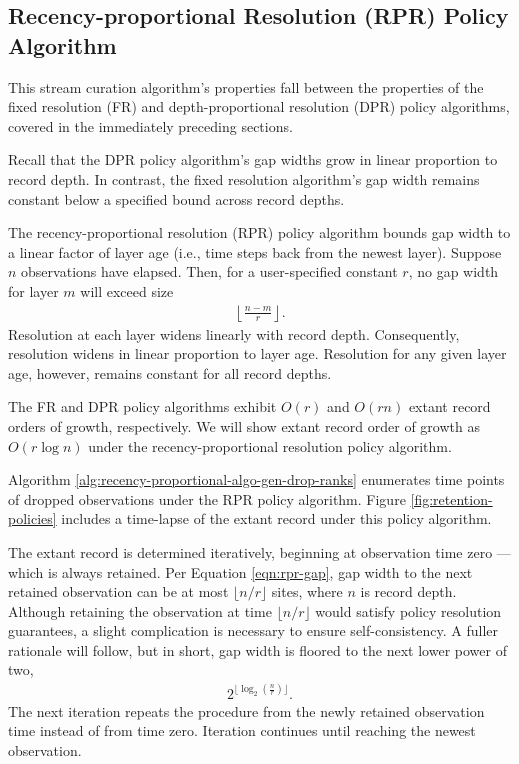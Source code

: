 \subsection{Recency-proportional Resolution (RPR) Policy Algorithm}
\label{sec:recency-proportional-resolution-algo}

This stream curation algorithm's properties fall between the properties of the fixed resolution (FR) and depth-proportional resolution (DPR) policy algorithms, covered in the immediately preceding sections.

Recall that the DPR policy algorithm's gap widths grow in linear proportion to record depth.
In contrast, the fixed resolution algorithm's gap width remains constant below a specified bound across record depths.

The recency-proportional resolution (RPR) policy algorithm bounds gap width to a linear factor of layer age (i.e., time steps back from the newest layer).
Suppose $n$ observations have elapsed.
Then, for a user-specified constant $r$, no gap width for layer $m$ will exceed size
\begin{align}
  \left\lfloor \frac{n - m}{r} \right\rfloor.
  \label{eqn:rpr-gap}
\end{align}
Resolution at each layer widens linearly with record depth.
Consequently, resolution widens in linear proportion to layer age.
Resolution for any given layer age, however, remains constant for all record depths.

The FR and DPR policy algorithms exhibit $O(r)$ and $O(rn)$ extant record orders of growth, respectively.
We will show extant record order of growth as $O(r\log{n})$ under the recency-proportional resolution policy algorithm.

Algorithm \ref{alg:recency-proportional-algo-gen-drop-ranks} enumerates time points of dropped observations under the RPR policy algorithm.
Figure \ref{fig:retention-policies} includes a time-lapse of the extant record under this policy algorithm.

The extant record is determined iteratively, beginning at observation time zero --- which is always retained.
Per Equation \ref{eqn:rpr-gap}, gap width to the next retained observation can be at most $\lfloor n/r \rfloor$ sites, where $n$ is record depth.
Although retaining the observation at time $\lfloor n/r \rfloor$ would satisfy policy resolution guarantees, a slight complication is necessary to ensure self-consistency.
A fuller rationale will follow, but in short, gap width is floored to the next lower power of two,
\begin{align*}
  2^{\lfloor \log_{2}\left(\frac{n}{r}\right) \rfloor}.
\end{align*}
The next iteration repeats the procedure from the newly retained observation time instead of from time zero.
Iteration continues until reaching the newest observation.

